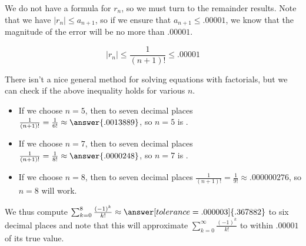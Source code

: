 \documentclass{ximera}
\begin{document}
\begin{exercise}
\begin{exercise}
\begin{exercise}
\begin{exercise}
We do not have a formula for $r_n$, so we must turn to the remainder results.  Note that we have $\big|r_n\big| \leq a_{n+1}$, so if we ensure that $a_{n+1} \leq .00001$, we know that the magnitude of the error will be no more than $.00001$.

\[
\big|r_n\big| \leq \frac{1}{(n+1)!} \leq .00001
\]

There isn't a nice general method for solving equations with factorials, but we can check if the above inequality holds for various $n$.

\begin{itemize}
\item If we choose $n=5$, then to seven decimal places $\frac{1}{(n+1)!} = \frac{1}{6!} \approx \answer{.0013889}$, so $n=5$ is  .
\item If we choose $n=7$, then to seven decimal places $\frac{1}{(n+1)!} = \frac{1}{8!} \approx \answer{.0000248}$, so $n=7$ is  .
\item If we choose $n=8$, then to seven decimal places $\frac{1}{(n+1)!} = \frac{1}{9!} \approx .000000276$, so $n=8$ will work.
\end{itemize}

We thus compute $\sum_{k=0}^8 \frac{(-1)^k}{k!} \approx \answer[tolerance=.000003]{.367882}$ to six decimal places and note that this will approximate $\sum_{k=0}^\infty \frac{(-1)^k}{k!}$ to within $.00001$ of its true value.
\end{exercise}

\end{exercise}

\end{exercise}
\end{exercise}
\end{document}
